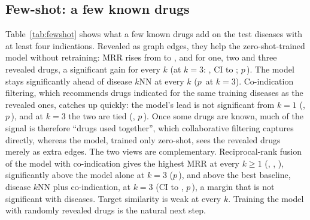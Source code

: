 \documentclass[journal]{IEEEtran}
\begin{document}
\subsection{Few-shot: a few known drugs}
\label{sec:fewshot}
Table~\ref{tab:fewshot} shows what a few known drugs add on the \FsN{} test diseases with at least four indications. Revealed as graph edges, they help the zero-shot-trained model without retraining: MRR rises from \FsBppZeroMrr{} to \FsBppOneMrr, \FsBppTwoMrr{} and \FsBppThreeMrr{} for one, two and three revealed drugs, a significant gain for every $k$ (at $k=3$: \FsBppGainThree, CI \FsBppGainLoThree{} to \FsBppGainHiThree; $p$\,\FsBppGainPThree). The model stays significantly ahead of disease $k$NN at every $k$ ($p$\,\FsPBppKnnThree{} at $k=3$). Co-indication filtering, which recommends drugs indicated for the same training diseases as the revealed ones, catches up quickly: the model's lead is not significant from $k=1$ (\FsDiffBppCoindOne, $p$\,\FsPBppCoindOne), and at $k=3$ the two are tied (\FsDiffBppCoindThree, $p$\,\FsPBppCoindThree). Once some drugs are known, much of the signal is therefore ``drugs used together'', which collaborative filtering captures directly, whereas the model, trained only zero-shot, sees the revealed drugs merely as extra edges. The two views are complementary. Reciprocal-rank fusion of the model with co-indication gives the highest MRR at every $k\geq1$ (\FsRrfOneMrr, \FsRrfTwoMrr, \FsRrfThreeMrr), significantly above the model alone at $k=3$ ($p$\,\FsPBppRrfThree), and \FsDiffRrfKnnCoindThree{} above the best baseline, disease $k$NN plus co-indication, at $k=3$ (CI \FsDiffLoRrfKnnCoindThree{} to \FsDiffHiRrfKnnCoindThree, $p$\,\FsPRrfKnnCoindThree), a margin that is not significant with \FsN{} diseases. Target similarity is weak at every $k$. Training the model with randomly revealed drugs is the natural next step.

\begin{table}[!t]
\centering
\caption{Few-shot ranking on the \FsN{} test diseases with $\geq$4 indications: MRR on the same held-back indications after revealing $k$ known drugs (\FsDraws{} random draws; \sysname averaged over \TestSeeds{} seeds, not retrained). Columns: MRR for $k$ revealed drugs; H@10 at $k$=3. Best per column in bold.}
\label{tab:fewshot}
\scriptsize
\setlength{\tabcolsep}{2.5pt}

\end{table}
\end{document}
